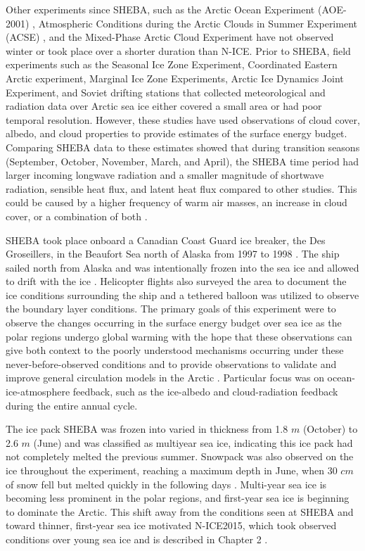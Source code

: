 Other experiments since SHEBA, such as the Arctic Ocean Experiment (AOE-2001) \citep{tjernstrom:2005}, Atmospheric Conditions during the Arctic Clouds in Summer Experiment (ACSE) \citep{sotiropoulou:2016}, and the Mixed-Phase Arctic Cloud Experiment \citep{verlinde:2007} have not observed winter or took place over a shorter duration than N-ICE. Prior to SHEBA, field experiments such as the Seasonal Ice Zone Experiment, Coordinated Eastern Arctic experiment, Marginal Ice Zone Experiments, Arctic Ice Dynamics Joint Experiment, and Soviet drifting stations \citep{vihma:2005, kahl:1999} that collected meteorological and radiation data over Arctic sea ice either covered a small area or had poor temporal resolution. However, these studies have used observations of cloud cover, albedo, and cloud properties to provide estimates of the surface energy budget. Comparing SHEBA data to these estimates showed that during transition seasons (September, October, November, March, and April), the SHEBA time period had larger incoming longwave radiation and a smaller magnitude of shortwave radiation, sensible heat flux, and latent heat flux compared to other studies. This could be caused by a higher frequency of warm air masses, an increase in cloud cover, or a combination of both \citep{persson:2002}. 

SHEBA took place onboard a Canadian Coast Guard ice breaker, the Des Groseillers, in the Beaufort Sea north of Alaska from 1997 to 1998 \citep{uttal:2002, shupe:2004}. The ship sailed north from Alaska and was intentionally frozen into the sea ice and allowed to drift with the ice \citep{uttal:2002}. Helicopter flights also surveyed the area to document the ice conditions surrounding the ship and a tethered balloon was utilized to observe the boundary layer conditions. The primary goals of this experiment were to observe the changes occurring in the surface energy budget over sea ice as the polar regions undergo global warming with the hope that these observations can give both context to the poorly understood mechanisms occurring under these never-before-observed conditions and to provide observations to validate and improve general circulation models in the Arctic \citep{uttal:2002}. Particular focus was on ocean-ice-atmosphere feedback, such as the ice-albedo and cloud-radiation feedback during the entire annual cycle. 

The ice pack SHEBA was frozen into varied in thickness from 1.8 $m$ (October) to 2.6 $m$ (June) and was classified as multiyear sea ice, indicating this ice pack had not completely melted the previous summer. Snowpack was also observed on the ice throughout the experiment, reaching a maximum depth in June, when 30 $cm$ of snow fell but melted quickly in the following days \citep{uttal:2002}. Multi-year sea ice is becoming less prominent in the polar regions, and first-year sea ice is beginning to dominate the Arctic. This shift away from the conditions seen at SHEBA and toward thinner, first-year sea ice motivated N-ICE2015, which took observed conditions over young sea ice and is described in Chapter 2 \citep{graham:2017}. 

